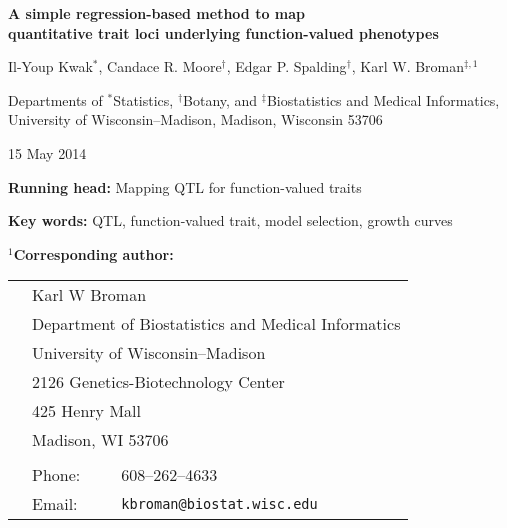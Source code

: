 \documentclass[12pt,letterpaper]{article}
\begin{document}

\vspace*{8mm}
\begin{center}

\textbf{\Large A simple regression-based method to map \\
  quantitative trait loci underlying function-valued
  phenotypes}

\bigskip \bigskip \bigskip \bigskip

{\large Il-Youp Kwak$^*$, Candace R. Moore$^\dagger$, Edgar
  P. Spalding$^\dagger$, Karl W. Broman$^{\ddagger,1}$}

\bigskip \bigskip

Departments of $^*$Statistics, $^\dagger$Botany, and $^\ddagger$Biostatistics and Medical
Informatics, \\
University of Wisconsin--Madison, Madison, Wisconsin 53706
\end{center}


\vfill

\hfill
{\footnotesize 15 May 2014}

\newpage

\noindent \textbf{Running head:} Mapping QTL for function-valued traits


\bigskip \bigskip \bigskip

\noindent \textbf{Key words:} QTL, function-valued trait, model
selection, growth curves



\bigskip \bigskip \bigskip

\noindent \textbf{$^1$Corresponding author:}

\begin{tabular}{lll}
 \\
 \hspace{1cm} & \multicolumn{2}{l}{Karl W Broman} \\
 & \multicolumn{2}{l}{Department of Biostatistics and Medical Informatics} \\
 & \multicolumn{2}{l}{University of Wisconsin--Madison} \\
 & \multicolumn{2}{l}{2126 Genetics-Biotechnology Center} \\
 & \multicolumn{2}{l}{425 Henry Mall} \\
 & \multicolumn{2}{l}{Madison, WI 53706} \\
 \\
 & Phone: & 608--262--4633 \\
 & Email: & \verb|kbroman@biostat.wisc.edu|
\end{tabular}
\end{document}
